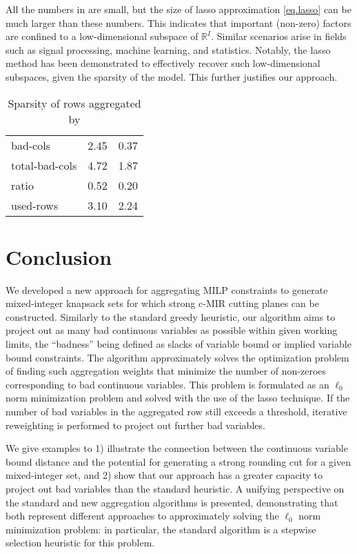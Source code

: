 \documentclass[a4paper,UKenglish,cleveref, autoref,  thm-restate]{lipics-v2021}
\newcommand{\bR}{\mathbb{R}}
\begin{document}
	
	All the numbers in  are small, but the size of lasso approximation \eqref{eq.lasso} can be much larger than these numbers. This indicates that important (non-zero) factors are confined to a low-dimensional subspace of $\bR^I$. Similar scenarios arise in fields such as signal processing, machine learning, and statistics. Notably, the lasso method has been demonstrated \cite{candes2005decoding} to effectively recover such low-dimensional subspaces, given the sparsity of the model. This further justifies our approach.
	
	
	
	
	\begin{table}
		\centering
		\caption{Sparsity of rows aggregated by }
		\label{tab:metrics}
		\begin{tabular}{lrr}
			\toprule
			&       \Cref{algo.mw} & \Cref{algo.lp} \\
			\midrule
			bad-cols &  2.45 &  0.37 \\
			total-bad-cols &    4.72 &  1.87 \\
			ratio &     0.52 &  0.20 \\
			used-rows &     3.10 &  2.24 \\
			\bottomrule
		\end{tabular}
	\end{table}
	
	
	\section{Conclusion} \label{sec.conclu}
	
	
	We developed a new approach for aggregating MILP constraints to generate mixed-integer knapsack sets for which strong c-MIR cutting planes can be constructed.
	Similarly to the standard greedy heuristic, our algorithm aims to project out as many bad continuous variables as possible within given working limits, the ``badness'' being defined as slacks of variable bound or implied variable bound constraints.
	The algorithm approximately solves the optimization problem of finding such aggregation weights that minimize the number of non-zeroes corresponding to bad continuous variables.
	This problem is formulated as an $\ell_0$ norm minimization problem and solved with the use of the lasso technique.
	If the number of bad variables in the aggregated row still exceeds a threshold, iterative reweighting is performed to project out further bad variables.
	
	
	We give examples to 1) illustrate the connection between the continuous variable bound distance and the potential for generating a strong rounding cut for a given mixed-integer set, and 2) show that our approach has a greater capacity to project out bad variables than the standard heuristic.
	A unifying perspective on the standard and new aggregation algorithms is presented, demonstrating that both represent different approaches to approximately solving the $\ell_0$ norm minimization problem: in particular, the standard algorithm is a stepwise selection heuristic for this problem.
	
\end{document}
